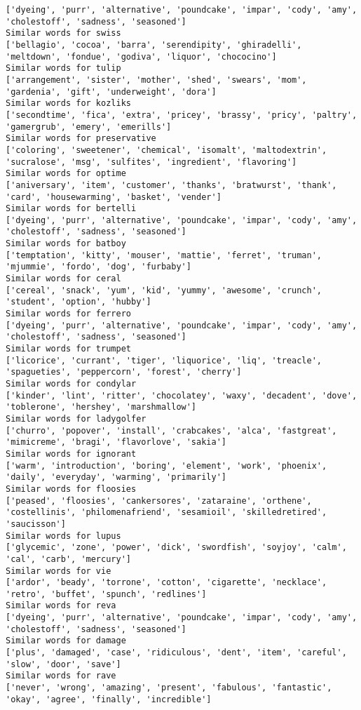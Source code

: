 \documentclass[11pt]{article}
\begin{document}
\begin{Verbatim}[commandchars=\\\{\}]
['dyeing', 'purr', 'alternative', 'poundcake', 'impar', 'cody', 'amy', 'cholestoff', 'sadness', 'seasoned']
Similar words for swiss
['bellagio', 'cocoa', 'barra', 'serendipity', 'ghiradelli', 'meltdown', 'fondue', 'godiva', 'liquor', 'chococino']
Similar words for tulip
['arrangement', 'sister', 'mother', 'shed', 'swears', 'mom', 'gardenia', 'gift', 'underweight', 'dora']
Similar words for kozliks
['secondtime', 'fica', 'extra', 'pricey', 'brassy', 'pricy', 'paltry', 'gamergrub', 'emery', 'emerills']
Similar words for preservative
['coloring', 'sweetener', 'chemical', 'isomalt', 'maltodextrin', 'sucralose', 'msg', 'sulfites', 'ingredient', 'flavoring']
Similar words for optime
['aniversary', 'item', 'customer', 'thanks', 'bratwurst', 'thank', 'card', 'housewarming', 'basket', 'vender']
Similar words for bertelli
['dyeing', 'purr', 'alternative', 'poundcake', 'impar', 'cody', 'amy', 'cholestoff', 'sadness', 'seasoned']
Similar words for batboy
['temptation', 'kitty', 'mouser', 'mattie', 'ferret', 'truman', 'mjummie', 'fordo', 'dog', 'furbaby']
Similar words for ceral
['cereal', 'snack', 'yum', 'kid', 'yummy', 'awesome', 'crunch', 'student', 'option', 'hubby']
Similar words for ferrero
['dyeing', 'purr', 'alternative', 'poundcake', 'impar', 'cody', 'amy', 'cholestoff', 'sadness', 'seasoned']
Similar words for trumpet
['licorice', 'currant', 'tiger', 'liquorice', 'liq', 'treacle', 'spagueties', 'peppercorn', 'forest', 'cherry']
Similar words for condylar
['kinder', 'lint', 'ritter', 'chocolatey', 'waxy', 'decadent', 'dove', 'toblerone', 'hershey', 'marshmallow']
Similar words for ladygolfer
['churro', 'popover', 'install', 'crabcakes', 'alca', 'fastgreat', 'mimicreme', 'bragi', 'flavorlove', 'sakia']
Similar words for ignorant
['warm', 'introduction', 'boring', 'element', 'work', 'phoenix', 'daily', 'everyday', 'warming', 'primarily']
Similar words for floosies
['peased', 'floosies', 'cankersores', 'zataraine', 'orthene', 'costellinis', 'philomenafriend', 'sesamioil', 'skilledretired', 'saucisson']
Similar words for lupus
['glycemic', 'zone', 'power', 'dick', 'swordfish', 'soyjoy', 'calm', 'cal', 'carb', 'mercury']
Similar words for vie
['ardor', 'beady', 'torrone', 'cotton', 'cigarette', 'necklace', 'retro', 'buffet', 'spunch', 'redlines']
Similar words for reva
['dyeing', 'purr', 'alternative', 'poundcake', 'impar', 'cody', 'amy', 'cholestoff', 'sadness', 'seasoned']
Similar words for damage
['plus', 'damaged', 'case', 'ridiculous', 'dent', 'item', 'careful', 'slow', 'door', 'save']
Similar words for rave
['never', 'wrong', 'amazing', 'present', 'fabulous', 'fantastic', 'okay', 'agree', 'finally', 'incredible']

\end{Verbatim}
\end{document}
